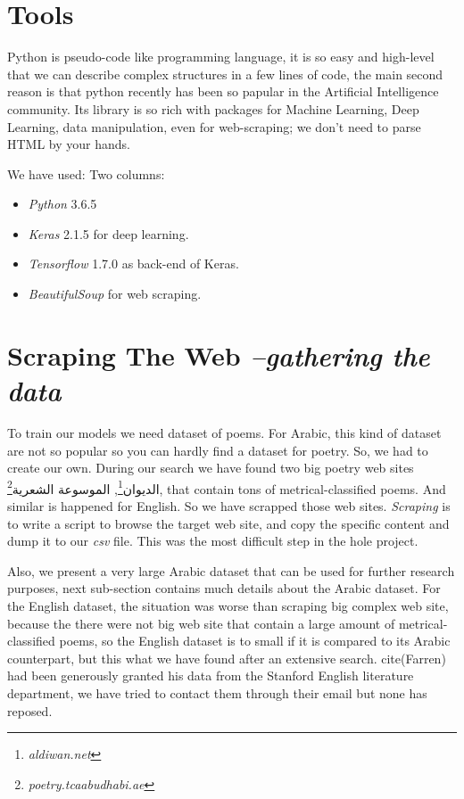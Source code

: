 \documentclass[12pt]{report}
\begin{document}
\section{Tools}
Python is pseudo-code like programming language, it is so easy and high-level
that we can describe complex structures in a few lines of code, the main second
reason is that python recently has been so papular in the Artificial Intelligence
community. Its library is so rich with packages for Machine Learning, Deep
Learning, data manipulation, even for web-scraping; we don't need to parse HTML
by your hands.

We have used:
Two columns:
\begin{itemize}
\item \textit{Python} 3.6.5
\item \textit{Keras} 2.1.5 for deep learning.
\item \textit{Tensorflow} 1.7.0 as back-end of Keras.
\item \textit{BeautifulSoup} for web scraping.
\end{itemize}







\section{Scraping The Web \textit{\small --gathering the data}}
To train our models we need dataset of poems. For Arabic, this kind of dataset
are not so popular so you can hardly find a dataset for poetry. So, we had to
create our own. During our search we have found two big poetry web sites
\textarabic{الديوان}\footnote{\textit{aldiwan.net}}, \textarabic{الموسوعة
الشعرية}\footnote{\textit{poetry.tcaabudhabi.ae}}, that
contain tons of metrical-classified poems. And similar is happened for English.
So we have scrapped those web sites. \textit{Scraping} is to write a script to
browse the target web site, and copy the specific content and dump it to our
\textit{csv} file. This was the most difficult step in the hole project. 
 
Also, we present a very large Arabic dataset that can be used for further
research purposes, next sub-section contains much details about the Arabic
dataset. For the English dataset, the situation was worse than scraping big
complex web site, because the there were not big web site that contain a large
amount of metrical-classified poems, so the English dataset is to small if it is
compared to its Arabic counterpart, but this what we have found after an
extensive search. 
cite(Farren) had been generously granted his data from the
Stanford English literature department, we have tried to contact them through
their email but none has reposed.
\end{document}
